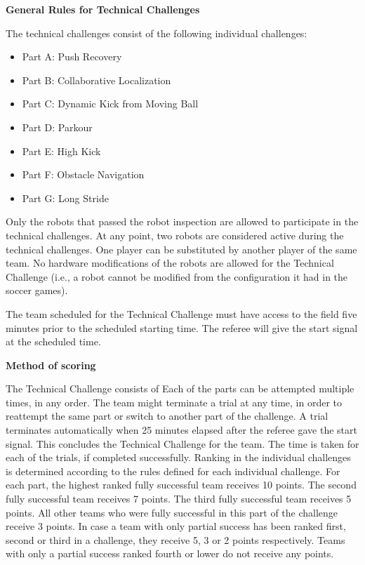 \clearpage
\sffamily
{\bfseries\color[rgb]{0.4,0.4,0.4}
General Rules for Technical Challenges}
{}

\bigskip

The technical challenges consist of the following individual challenges:

\begin{itemize}
\item Part A: Push Recovery 
\item Part B: Collaborative Localization 
\item Part C: Dynamic Kick from Moving Ball
\item Part D: Parkour
\item Part E: High Kick
\item Part F: Obstacle Navigation
\item Part G: Long Stride
\end{itemize}

\bigskip

Only the robots that passed the robot inspection are allowed to participate in the technical challenges.
At any point, two robots are considered active during the technical challenges.
One player can be substituted by another player of the same team.
No hardware modifications of the robots are allowed for the Technical Challenge
(i.e., a robot cannot be modified from the configuration it had in the soccer games). 

\bigskip

The team scheduled for the Technical Challenge must have access to the field five minutes prior to the scheduled starting time. The referee will give the start signal at the scheduled time.

\bigskip

{\bfseries Method of scoring}

\headlinebox
 
The Technical Challenge consists of 
Each of the parts can be attempted multiple times, in any order.
The team might terminate a trial at any time,
in order to reattempt the same part or switch to another part of the challenge.
A trial terminates automatically when 25 minutes elapsed after the referee gave
the start signal.
This concludes the Technical Challenge for the team.
The time is taken for each of the trials, if completed successfully.
Ranking in the individual challenges is determined according to the rules
defined for each individual challenge.
For each part, the highest ranked fully successful team receives 10 points.
The second fully successful team receives 7 points.
The third fully successful team receives 5 points.
All other teams who were fully successful in this part of the challenge receive 3 points.
In case a team with only partial success has been ranked first, second or third in a challenge, they receive 5, 3 or 2 points respectively.
Teams with only a partial success ranked fourth or lower do not receive any points.

